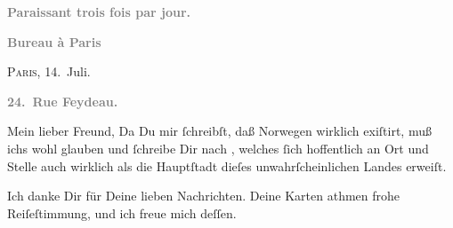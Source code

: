 \pstart
           \begin{otherlanguage}{french}\textcolor{gray}{\textbf{\textbf{Paraissant trois fois par jour.}}}\end{otherlanguage}\pend
           
\pstart
           \begin{otherlanguage}{french}\textcolor{gray}{\textbf{\textbf{Bureau à Paris}}}\end{otherlanguage}\hfill \textsc{Paris}, 14. Juli.\pend
           
\pstart
           \begin{otherlanguage}{french}\textcolor{gray}{\textbf{\textbf{24. Rue Feydeau.}}}\end{otherlanguage}\pend
           
\pstart\center{}Mein lieber Freund,\pend\vspace{0.5em}
\pstart
           Da Du mir{ }ſchreibſt, daß Norwegen wirklich
               exiſtirt, muß ichs wohl glauben und{ }ſchreibe Dir nach \label{K_L02781-1v}\label{K_L02781-1}, welches{ }ſich hoffentlich an Ort und Stelle auch
               wirklich als die Hauptſtadt
               dieſes unwahrſcheinlichen Landes erweiſt.\pend
           
\pstart
           Ich danke Dir für Deine lieben Nachrichten. Deine Karten athmen frohe Reiſeſtimmung,
               und ich freue mich deſſen.\pend
           
